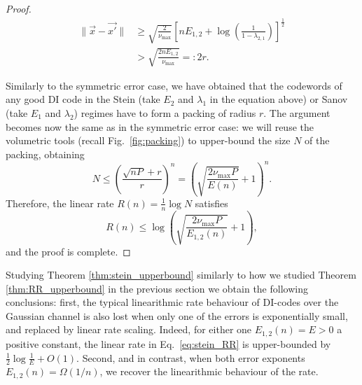 \documentclass[10pt,conference]{IEEEtran}
\newcommand{\1}{\mathds{1}}
\newcommand{\pau}[1]{{\color{purple}#1}}
\begin{document}
\begin{proof}
\begin{equation}
\begin{split}
  \|\vec{x}-\vec{x'}\|
    &\geq \sqrt{\frac{2}{\nu_{\max}}}\left[nE_{1,2}+\log\left(\frac{1}{1-\lambda_{2,1}}\right)\right]^{\frac12}\\
    &>    \sqrt{\frac{2nE_{1,2}}{\nu_{\max}}} =: 2r.
\end{split}
\end{equation}

Similarly to the symmetric error case, we have obtained that the codewords of any good DI code in the Stein (take $E_2$ and $\lambda_1$ in the equation above) or Sanov (take $E_1$ and $\lambda_2$) regimes have to form a packing of radius $r$. The argument becomes now the same as in the symmetric error case: we will reuse the volumetric tools (recall Fig.~\ref{fig:packing}) to upper-bound the size $N$ of the packing, obtaining
\begin{equation}
  N\leq\left(\frac{\sqrt{nP}+r}{r}\right)^n
    =\left(\sqrt{\frac{2\nu_{\max}P}{E(n)}}+1\right)^n.
\end{equation}
Therefore, the linear rate $R(n)=\frac1n \log N$ satisfies
\begin{equation}
  \label{eq:stein_RR}
  R(n) \leq \log\left(\sqrt{\frac{2\nu_{\max}P}{E_{1,2}(n)}}+1\right),
\end{equation}
and the proof is complete.
\end{proof}

Studying Theorem \ref{thm:stein_upperbound} similarly to how we studied Theorem \ref{thm:RR_upperbound} in the previous section we obtain the following conclusions:
first, the typical linearithmic rate behaviour of DI-codes over the Gaussian channel is also lost when only one of the errors is exponentially small, and replaced by linear rate scaling. Indeed, for either one $E_{1,2}(n)=E>0$ a positive constant, the linear rate in Eq.~\eqref{eq:stein_RR} is upper-bounded by $\frac12\log\frac{1}{E} + O(1)$. Second, and in contrast, when both error exponents $E_{1,2}(n) = \Omega(1/n)$, we recover the linearithmic behaviour of the rate.
\end{document}
